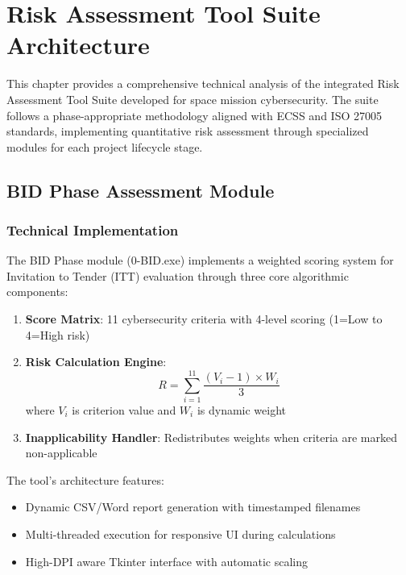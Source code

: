 \documentclass[binding=0.6cm]{sapthesis}
\begin{document}
\chapter{Risk Assessment Tool Suite Architecture}
\label{ch:components}

This chapter provides a comprehensive technical analysis of the integrated Risk Assessment Tool Suite developed for space mission cybersecurity. The suite follows a phase-appropriate methodology aligned with ECSS and ISO 27005 standards, implementing quantitative risk assessment through specialized modules for each project lifecycle stage.

\section{BID Phase Assessment Module}
\label{sec:bid_tool}

\subsection{Technical Implementation}

The BID Phase module (0-BID.exe) implements a weighted scoring system for Invitation to Tender (ITT) evaluation through three core algorithmic components:

\begin{enumerate}
    \item \textbf{Score Matrix}: 11 cybersecurity criteria with 4-level scoring (1=Low to 4=High risk)
    \item \textbf{Risk Calculation Engine}: 
    \begin{equation}
        R = \sum_{i=1}^{11} \frac{(V_i - 1) \times W_i}{3}
    \end{equation}
    where $V_i$ is criterion value and $W_i$ is dynamic weight
    \item \textbf{Inapplicability Handler}: Redistributes weights when criteria are marked non-applicable
\end{enumerate}

The tool's architecture features:

\begin{itemize}
    \item Dynamic CSV/Word report generation with timestamped filenames
    \item Multi-threaded execution for responsive UI during calculations
    \item High-DPI aware Tkinter interface with automatic scaling
\end{itemize}
\end{document}
